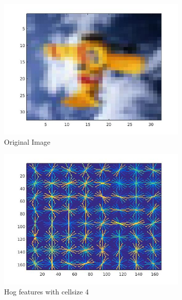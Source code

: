 \documentclass{article} %
\begin{document}
\begin{figure}
\begin{subfigure}{0.33\textwidth}
\centering
\includegraphics[scale=0.25]{images/hog_original}
\caption{Original Image}
\end{subfigure}
\begin{subfigure}{0.33\textwidth}
\centering
\includegraphics[scale=0.25]{images/hog_cellsize_4}
\caption{Hog features with cellsize 4}
\end{subfigure}
\begin{subfigure}{0.33\textwidth}
\centering

\end{subfigure}
\end{figure}
\end{document}
